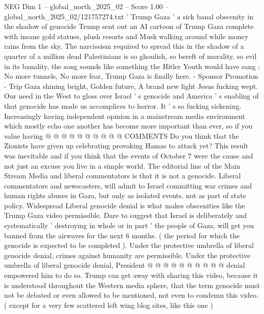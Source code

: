 \begin{textsample}{NEG Dim 1 – global\_north\_2025\_02 – Score 1.00 – global\_north\_2025\_02/121757274.txt}  \label{ex:f1_neg_017}
' Trump Gaza ' a sick banal obscenity in the shadow of genocide Trump sent out an AI cartoon of Trump Gaza complete with insane gold statues, plush resorts and Musk walking around while money rains from the sky.
The narcissism required to spread this in the shadow of a quarter of a million dead Palestinians is so ghoulish, so bereft of morality, so evil in its banality, the song sounds like something the Hitler Youth would have sang : No more tunnels, No more fear, Trump Gaza is finally here. - Sponsor Promotion - Trip Gaza shining bright, Golden future, A brand new light Jesus fucking wept.
Our need in the West to gloss over Israel ' s genocide and America ' s enabling of that genocide has made us accomplices to horror.
It ' s so fucking sickening.
Increasingly having independent opinion in a mainstream media environment which mostly echo one another has become more important than ever, so if you value having @ @ @ @ @ @ @ @ @ @ COMMENTS Do you think that the Zionists have given up celebrating provoking Hamas to attack yet?
This result was inevitable and if you think that the events of October 7 were the cause and not just an excuse you live in a simple world.
The editorial line of the Main Stream Media and liberal commentators is that it is not a genocide.
Liberal commentators and newscasters, will admit to Israel committing war crimes and human rights abuses in Gaza, but only as isolated events. not as part of state policy.
Widespread Liberal genocide denial is what makes obscenities like the Trump Gaza video permissible.
Dare to suggest that Israel is deliberately and systematically ' destroying in whole or in part ' the people of Gaza, will get you banned from the airwaves for the next 6 months. ( the period for which the genocide is expected to be completed ).
Under the protective umbrella of liberal genocide denial, crimes against humanity are permissible.
Under the protective umbrella of liberal genocide denial, President @ @ @ @ @ @ @ @ @ @ denial empowered him to do so.
Trump can get away with sharing this video, because it is understood throughout the Western media sphere, that the term genocide must not be debated or even allowed to be mentioned, not even to condemn this video. ( except for a very few scattered left wing blog sites, like this one )

\end{textsample}
